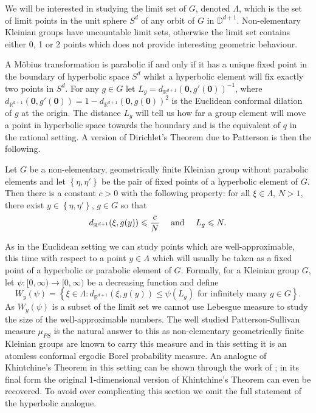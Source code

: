 We will be interested in studying the limit set of $G$, denoted $\Lambda$, which is the set of limit points in the unit sphere $S^d$ of any orbit of $G$ in $\mathbb{D}^{d+1}$. Non-elementary Kleinian groups have uncountable limit sets, otherwise the limit set contains either 0, 1 or 2 points which does not provide interesting geometric behaviour. 

A M{\"o}bius transformation is parabolic if and only if it has a unique fixed point in the boundary of hyperbolic space $S^d$ whilst a hyperbolic element will fix exactly two points in $S^d$. For any $g \in G$ let $L_g = d_{\mathbb{R}^{d+1}}(\mathbf{0}, g'(\mathbf{0}))^{-1}$, where $d_{\mathbb{R}^{d+1}}(\mathbf{0}, g'(\mathbf{0})) = 1 - d_{\mathbb{R}^{d+1}}(\mathbf{0}, g(\mathbf{0})) ^2$ is the Euclidean conformal dilation of $g$ at the origin. The distance $L_g$ will tell us how far a group element will move a point in hyperbolic space towards the boundary and is the equivalent of $q$ in the rational setting. A version of Dirichlet's Theorem due to Patterson \cite{patterson} is then the following.

\begin{theorem}
Let $G$ be a non-elementary, geometrically finite Kleinian group without parabolic elements and let $\left\{ \eta, \eta' \right\}$ be the pair of fixed points of a hyperbolic element of $G$. Then there is a constant $c > 0$ with the following property: for all $\xi \in \Lambda$, $N > 1$, there exist $y \in \left\{ \eta, \eta'\right\}$, $g \in G$ so that
\[
d_{\mathbb{R}^{d+1}}(\xi, g(y)) \le \frac{c}{N} \quad \textup{ and } \quad L_g \le N.
\]
\end{theorem}

As in the Euclidean setting we can study points which are well-approximable, this time with respect to a point $y \in \Lambda$ which will usually be taken as a fixed point of a hyperbolic or parabolic element of $G$. Formally, for a Kleinian group $G$, let $\psi \colon [0,\infty) \rightarrow [0,\infty)$ be a decreasing function and define
\[
W_y(\psi) = \left\{ \xi \in \Lambda \colon d_{\mathbb{R}^{d+1}}(\xi, g(y)) \le \psi(L_g) \text{ for infinitely many } g \in G \right\}.
\]
As $W_y(\psi)$ is a subset of the limit set we cannot use Lebesgue measure to study the size of the well-approximable numbers. The well studied Patterson-Sullivan measure $\mu_{PS}$ is the natural answer to this as non-elementary geometrically finite Kleinian groups are known to carry this measure and in this setting it is an atomless conformal ergodic Borel probability measure. An analogue of Khintchine's Theorem in this setting can be shown through the work of \cite{patterson, stratmann, stratmann-velani, beres-dick-velani}; in its final form the original 1-dimensional version of Khintchine's Theorem can even be recovered. To avoid over complicating this section we omit the full statement of the hyperbolic analogue.

